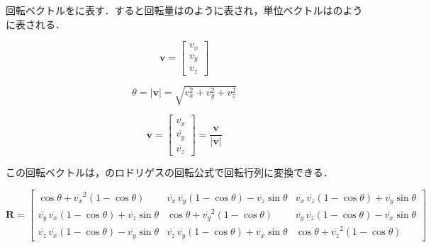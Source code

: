 \documentclass[a4j,titlepage,11pt]{jarticle}
\begin{document}


回転ベクトルをに表す．すると回転量はのように表され，単位ベクトルはのように表される．

\begin{equation}
  \bm{v} = \begin{bmatrix}
    v_{x} \\ v_{y} \\ v_{z}
  \end{bmatrix}
  \label{Eq:1} %
\end{equation}

\begin{equation}
  \theta = | \bm{v} | = \sqrt{v_{x}^{2} + v_{y}^{2} + v_{z}^{2}}
  \label{Eq:2} %
\end{equation}

\begin{equation}
  \overline{\bm{v}} = \begin{bmatrix}
    \overline{v_{x}} \\ \overline{v_{y}} \\ \overline{v_{z}}
  \end{bmatrix} = \frac{\bm{v}}{|\bm{v}|}
  \label{Eq:3} %
\end{equation}

この回転ベクトルは，のロドリゲスの回転公式で回転行列に変換できる．

\begin{equation}
  \bm{R} = \begin{bmatrix}
    \cos{\theta} + \overline{v_{x}}^{2} (1 - \cos{\theta}) & \overline{v_{x}} \, \overline{v_{y}} (1 - \cos{\theta}) - \overline{v_{z}} \sin{\theta} & \overline{v_{x}} \, \overline{v_{z}} (1 - \cos{\theta}) + \overline{v_{y}} \sin{\theta} \\
    \overline{v_{y}} \, \overline{v_{x}} (1 - \cos{\theta}) + \overline{v_{z}} \sin{\theta} & \cos{\theta} + \overline{v_{y}}^{2} (1 - \cos{\theta}) & \overline{v_{y}} \, \overline{v_{z}} (1 - \cos{\theta}) - \overline{v_{x}} \sin{\theta} \\
    \overline{v_{z}} \, \overline{v_{x}} (1 - \cos{\theta}) - \overline{v_{y}} \sin{\theta} & \overline{v_{z}} \, \overline{v_{y}} (1 - \cos{\theta}) + \overline{v_{x}} \sin{\theta} & \cos{\theta} + \overline{v_{z}}^{2} (1 - \cos{\theta})
  \end{bmatrix}
  \label{Eq:4} %
\end{equation}
\end{document}
